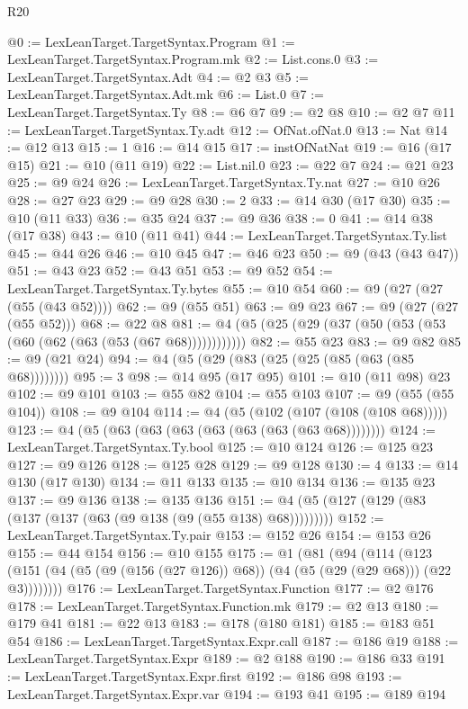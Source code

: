 \begin{lexlean}{R20}
\begin{coremodule}
@0 := LexLeanTarget.TargetSyntax.Program
@1 := LexLeanTarget.TargetSyntax.Program.mk
@2 := List.cons.{0}
@3 := LexLeanTarget.TargetSyntax.Adt
@4 := @2 @3
@5 := LexLeanTarget.TargetSyntax.Adt.mk
@6 := List.{0}
@7 := LexLeanTarget.TargetSyntax.Ty
@8 := @6 @7
@9 := @2 @8
@10 := @2 @7
@11 := LexLeanTarget.TargetSyntax.Ty.adt
@12 := OfNat.ofNat.{0}
@13 := Nat
@14 := @12 @13
@15 := 1
@16 := @14 @15
@17 := instOfNatNat
@19 := @16 (@17 @15)
@21 := @10 (@11 @19)
@22 := List.nil.{0}
@23 := @22 @7
@24 := @21 @23
@25 := @9 @24
@26 := LexLeanTarget.TargetSyntax.Ty.nat
@27 := @10 @26
@28 := @27 @23
@29 := @9 @28
@30 := 2
@33 := @14 @30 (@17 @30)
@35 := @10 (@11 @33)
@36 := @35 @24
@37 := @9 @36
@38 := 0
@41 := @14 @38 (@17 @38)
@43 := @10 (@11 @41)
@44 := LexLeanTarget.TargetSyntax.Ty.list
@45 := @44 @26
@46 := @10 @45
@47 := @46 @23
@50 := @9 (@43 (@43 @47))
@51 := @43 @23
@52 := @43 @51
@53 := @9 @52
@54 := LexLeanTarget.TargetSyntax.Ty.bytes
@55 := @10 @54
@60 := @9 (@27 (@27 (@55 (@43 @52))))
@62 := @9 (@55 @51)
@63 := @9 @23
@67 := @9 (@27 (@27 (@55 @52)))
@68 := @22 @8
@81 := @4 (@5 (@25 (@29 (@37 (@50 (@53 (@53 (@60 (@62 (@63 (@53 (@67 @68))))))))))))
@82 := @55 @23
@83 := @9 @82
@85 := @9 (@21 @24)
@94 := @4 (@5 (@29 (@83 (@25 (@25 (@85 (@63 (@85 @68))))))))
@95 := 3
@98 := @14 @95 (@17 @95)
@101 := @10 (@11 @98) @23
@102 := @9 @101
@103 := @55 @82
@104 := @55 @103
@107 := @9 (@55 (@55 @104))
@108 := @9 @104
@114 := @4 (@5 (@102 (@107 (@108 (@108 @68)))))
@123 := @4 (@5 (@63 (@63 (@63 (@63 (@63 (@63 (@63 @68))))))))
@124 := LexLeanTarget.TargetSyntax.Ty.bool
@125 := @10 @124
@126 := @125 @23
@127 := @9 @126
@128 := @125 @28
@129 := @9 @128
@130 := 4
@133 := @14 @130 (@17 @130)
@134 := @11 @133
@135 := @10 @134
@136 := @135 @23
@137 := @9 @136
@138 := @135 @136
@151 := @4 (@5 (@127 (@129 (@83 (@137 (@137 (@63 (@9 @138 (@9 (@55 @138) @68)))))))))
@152 := LexLeanTarget.TargetSyntax.Ty.pair
@153 := @152 @26
@154 := @153 @26
@155 := @44 @154
@156 := @10 @155
@175 := @1
    (@81
      (@94
        (@114
          (@123 (@151 (@4 (@5 (@9 (@156 (@27 @126)) @68)) (@4 (@5 (@29 (@29 @68))) (@22 @3))))))))
@176 := LexLeanTarget.TargetSyntax.Function
@177 := @2 @176
@178 := LexLeanTarget.TargetSyntax.Function.mk
@179 := @2 @13
@180 := @179 @41
@181 := @22 @13
@183 := @178 (@180 @181)
@185 := @183 @51 @54
@186 := LexLeanTarget.TargetSyntax.Expr.call
@187 := @186 @19
@188 := LexLeanTarget.TargetSyntax.Expr
@189 := @2 @188
@190 := @186 @33
@191 := LexLeanTarget.TargetSyntax.Expr.first
@192 := @186 @98
@193 := LexLeanTarget.TargetSyntax.Expr.var
@194 := @193 @41
@195 := @189 @194

\end{coremodule}
\end{lexlean}
